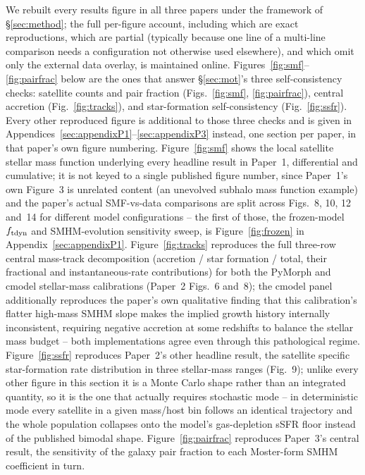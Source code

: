 \documentclass[fleqn,usenatbib]{mnras}
\begin{document}
We rebuilt every results figure in all three papers under the framework
of \S\ref{sec:method}; the full per-figure account, including which are
exact reproductions, which are partial (typically because one line of a
multi-line comparison needs a configuration not otherwise used
elsewhere), and which omit only the external data overlay, is
maintained online. Figures~\ref{fig:smf}--\ref{fig:pairfrac} below are
the ones that answer \S\ref{sec:mot}'s three self-consistency checks:
satellite counts and pair fraction (Figs.~\ref{fig:smf},
\ref{fig:pairfrac}), central accretion (Fig.~\ref{fig:tracks}), and
star-formation self-consistency (Fig.~\ref{fig:ssfr}). Every other
reproduced figure is additional to those three checks and is given in
Appendices~\ref{sec:appendixP1}--\ref{sec:appendixP3} instead, one
section per paper, in that paper's own figure numbering. Figure~\ref{fig:smf} shows the local satellite
stellar mass function underlying every headline result in Paper~1,
differential and cumulative; it is not keyed to a single published
figure number, since Paper~1's own Figure~3 is unrelated content (an
unevolved subhalo mass function example) and the paper's actual
SMF-vs-data comparisons are split across Figs.~8, 10, 12 and~14 for
different model configurations -- the first of those, the frozen-model
$f_{\rm tdyn}$ and SMHM-evolution sensitivity sweep, is
Figure~\ref{fig:frozen} in Appendix~\ref{sec:appendixP1}. Figure~\ref{fig:tracks} reproduces the full three-row central
mass-track decomposition (accretion / star formation / total, their
fractional and instantaneous-rate contributions) for both the PyMorph and
cmodel stellar-mass calibrations (Paper~2 Figs.~6 and~8); the cmodel
panel additionally reproduces the paper's own qualitative finding that
this calibration's flatter high-mass SMHM slope makes the implied growth
history internally inconsistent, requiring negative accretion at some
redshifts to balance the stellar mass budget -- both implementations
agree even through this pathological regime. Figure~\ref{fig:ssfr}
reproduces Paper~2's other headline result, the satellite specific
star-formation rate distribution in three stellar-mass ranges (Fig.~9);
unlike every other figure in this section it is a Monte Carlo shape
rather than an integrated quantity, so it is the one that actually
requires stochastic mode -- in deterministic mode every satellite in a
given mass/host bin follows an identical trajectory and the whole
population collapses onto the model's gas-depletion sSFR floor instead
of the published bimodal shape. Figure~\ref{fig:pairfrac}
reproduces Paper~3's central result, the sensitivity of the galaxy pair
fraction to each Moster-form SMHM coefficient in turn.
\end{document}
